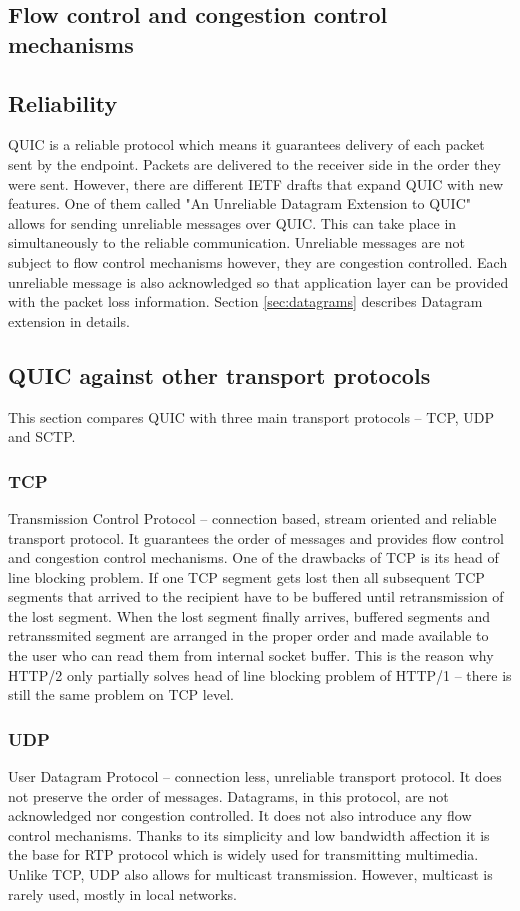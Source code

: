 \subsection{Flow control and congestion control mechanisms}
\label{subsec:flow-control-and-congestion-control}

\subsection{Reliability}
QUIC is a reliable protocol which means it guarantees delivery of each packet sent by the endpoint.
Packets are delivered to the receiver side in the order they were sent.
However, there are different IETF drafts that expand QUIC with new features.
One of them called "An Unreliable Datagram Extension to QUIC"\cite{bider-ssh-quic-09} allows for sending unreliable messages over QUIC.
This can take place in simultaneously to the reliable communication.
Unreliable messages are not subject to flow control mechanisms however, they are congestion controlled.
Each unreliable message is also acknowledged so that application layer can be provided with the packet loss information.
Section \ref{sec:datagrams} describes Datagram extension in details.

\subsection{QUIC against other transport protocols}
\label{sec:quic_against_other_transport_protocols}
This section compares QUIC with three main transport protocols -- TCP, UDP and SCTP.  
\subsubsection{TCP}
Transmission Control Protocol -- connection based, stream oriented and reliable transport protocol.
It guarantees the order of messages and provides flow control and congestion control mechanisms.
One of the drawbacks of TCP is its head of line blocking problem.
If one TCP segment gets lost then all subsequent TCP segments that arrived to the recipient have to be buffered until retransmission of the lost segment.
When the lost segment finally arrives, buffered segments and retranssmited segment are arranged in the proper order and made available to the user who can read them from internal socket buffer.
This is the reason why HTTP/2 only partially solves head of line blocking problem of HTTP/1 -- there is still the same problem on TCP level.
\subsubsection{UDP}
User Datagram Protocol -- connection less, unreliable transport protocol. 
It does not preserve the order of messages. 
Datagrams, in this protocol, are not acknowledged nor congestion controlled.
It does not also introduce any flow control mechanisms.
Thanks to its simplicity and low bandwidth affection it is the base for RTP protocol which is widely used for transmitting multimedia.
Unlike TCP, UDP also allows for multicast transmission.
However, multicast is rarely used, mostly in local networks.
